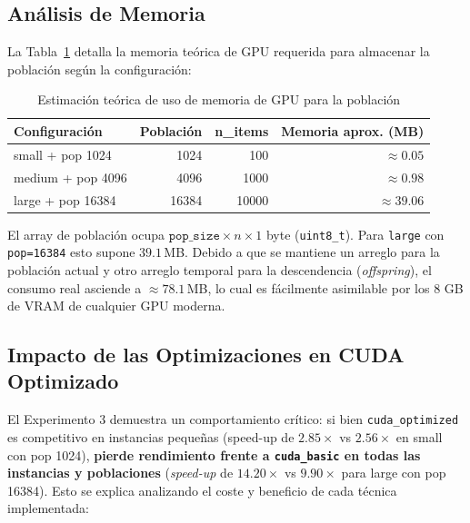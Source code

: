 \subsection{Análisis de Memoria}

La Tabla~\ref{tab:memoria} detalla la memoria teórica de GPU requerida para almacenar la población según la configuración:

\begin{table}[H]
  \centering
  \caption{Estimación teórica de uso de memoria de GPU para la población}
  \label{tab:memoria}
  \begin{tabular}{lrrr}
    \toprule
    \textbf{Configuración} & \textbf{Población} & \textbf{n\_items} &
    \textbf{Memoria aprox. (MB)} \\
    \midrule
    small  + pop 1024 & 1024  & 100   & $\approx 0.05$ \\
    medium + pop 4096 & 4096  & 1000  & $\approx 0.98$ \\
    large  + pop 16384 & 16384 & 10000 & $\approx 39.06$ \\
    \bottomrule
  \end{tabular}
\end{table}

El array de población ocupa $\texttt{pop\_size} \times n \times 1$ byte (\texttt{uint8\_t}). Para \texttt{large} con \texttt{pop=16384} esto supone $39.1$\,MB. Debido a que se mantiene un arreglo para la población actual y otro arreglo temporal para la descendencia (\emph{offspring}), el consumo real asciende a $\approx 78.1$\,MB, lo cual es fácilmente asimilable por los 8 GB de VRAM de cualquier GPU moderna.

\subsection{Impacto de las Optimizaciones en CUDA Optimizado}

El Experimento 3 demuestra un comportamiento crítico: si bien \texttt{cuda\_optimized} es competitivo en instancias pequeñas (speed-up de $2.85\times$ vs $2.56\times$ en small con pop 1024), \textbf{pierde rendimiento frente a \texttt{cuda\_basic} en todas las instancias y poblaciones} (\emph{speed-up} de $14.20\times$ vs $9.90\times$ para large con pop 16384). Esto se explica analizando el coste y beneficio de cada técnica implementada:

